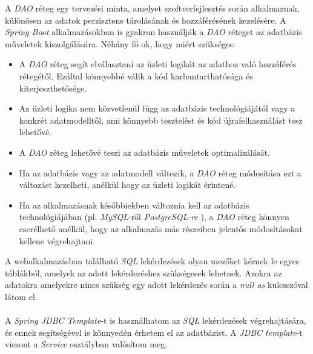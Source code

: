 
A \textit{DAO} \cite{DAO} réteg egy tervezési minta, amelyet szoftverfejlesztés során alkalmaznak, különösen az adatok perzisztens tárolásának és hozzáférésének kezelésére. A \textit{Spring Boot} \cite{spring_boot} alkalmazásokban is gyakran használják a \textit{DAO} \cite{DAO} réteget az adatbázis műveletek kiszolgálására. Néhány fő ok, hogy miért szükséges:

\begin{itemize}

\item{} A \textit{DAO} réteg segít elválasztani az üzleti logikát az adathoz való hozzáférés rétegétől. Ezáltal könnyebbé válik a kód karbantarthatósága és kiterjeszthetősége. 

\item{} Az üzleti logika nem közvetlenül függ az adatbázis technológiájától vagy a konkrét adatmodelltől, ami könnyebb tesztelést és kód újrafelhasználást tesz lehetővé. 

\item{} A \textit{DAO} réteg lehetővé teszi az adatbázis műveletek optimalizálását. 

\item{} Ha az adatbázis vagy az adatmodell változik, a \textit{DAO} réteg módosítása ezt a változást kezelheti, anélkül hogy az üzleti logikát érintené. 

\item{} Ha az alkalmazásnak későbbiekben változnia kell az adatbázis technológiájában (pl. \textit{MySQL}-ről \cite{MySQL} \textit{PostgreSQL-re} \cite{PostgreSQL}), a \textit{DAO} réteg könnyen cserélhető anélkül, hogy az alkalmazás más részeiben jelentős módosításokat kellene végrehajtani.

\end{itemize}

A webalkalmazásban található \textit{SQL} \cite{SQL} lekérdezések olyan mezőket kérnek le egyes táblákból, amelyek az adott lekérdezéshez szükségesek lehetnek. Azokra az adatokra amelyekre nincs szükség egy adott lekérdezés során a \textit{null as} kulcsszóval látom el.\\
\\
A \textit{Spring JDBC Template}-t \cite{JdbcTemplate} is használhatom az \textit{SQL} lekérdezések végrehajtására, és ennek segítségével is könnyedén érhetem el az adatbázist. A \textit{JDBC template}-t viszont a \textit{Service} osztályban valósítom meg.


